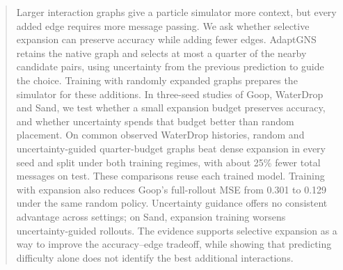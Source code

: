 \newlength{\takeawaywidth}
\newcommand{\takeaway}[2]{%
  \par\addvspace{6pt}%
  \begingroup
  \setlength{\fboxrule}{0.4pt}%
  \setlength{\fboxsep}{0pt}%
  \setlength{\takeawaywidth}{\dimexpr\linewidth-2\fboxrule\relax}%
  \noindent\fcolorbox{black}{black}{%
    \vbox{%
      \offinterlineskip
      \hbox to \takeawaywidth{%
        \hspace{8.4pt}%
        \normalfont\normalsize\bfseries\color{white}%
        \rule[-3pt]{0pt}{15pt}#1\hfil
      }%
      \hbox{\colorbox{takeawayfill}{%
        \parbox[t]{\takeawaywidth}{%
          \normalfont\normalsize
          \setlength{\parindent}{0pt}%
          \setlength{\parskip}{0pt}%
          \leftskip=8.4pt\relax
          \rightskip=8.4pt\relax
          \vspace*{5pt}%
          \strut #2\par
          \vspace*{5pt}%
        }%
      }}%
    }%
  }%
  \endgroup
  \par\addvspace{6pt}%
}



\begin{abstract}
Larger interaction graphs give a particle simulator more context, but every added edge requires more message passing. We ask whether selective expansion can preserve accuracy while adding fewer edges. AdaptGNS retains the native graph and selects at most a quarter of the nearby candidate pairs, using uncertainty from the previous prediction to guide the choice. Training with randomly expanded graphs prepares the simulator for these additions. In three-seed studies of Goop, WaterDrop and Sand, we test whether a small expansion budget preserves accuracy, and whether uncertainty spends that budget better than random placement. On common observed WaterDrop histories, random and uncertainty-guided quarter-budget graphs beat dense expansion in every seed and split under both training regimes, with about 25\% fewer total messages on test. These comparisons reuse each trained model. Training with expansion also reduces Goop's full-rollout MSE from 0.301 to 0.129 under the same random policy. Uncertainty guidance offers no consistent advantage across settings; on Sand, expansion training worsens uncertainty-guided rollouts. The evidence supports selective expansion as a way to improve the accuracy--edge tradeoff, while showing that predicting difficulty alone does not identify the best additional interactions.
\end{abstract}

